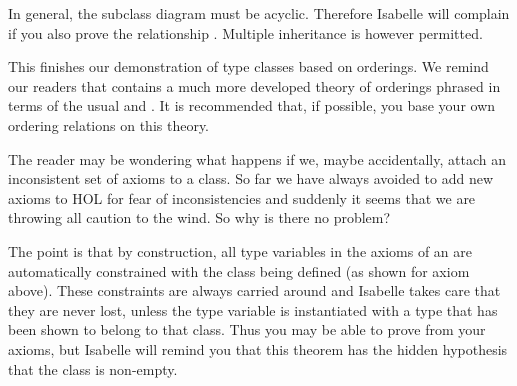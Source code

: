 \begin{isabellebody}
\begin{isamarkuptext}
In general, the subclass diagram must be acyclic. Therefore Isabelle will
complain if you also prove the relationship .
Multiple inheritance is however permitted.

This finishes our demonstration of type classes based on orderings.  We
remind our readers that  contains a much more developed theory of
orderings phrased in terms of the usual \isa{{\isasymle}} and \isa{{\isacharless}}.
It is recommended that, if possible,
you base your own ordering relations on this theory.%
\end{isamarkuptext}%
%
%
\begin{isamarkuptext}%
The reader may be wondering what happens if we, maybe accidentally,
attach an inconsistent set of axioms to a class. So far we have always
avoided to add new axioms to HOL for fear of inconsistencies and suddenly it
seems that we are throwing all caution to the wind. So why is there no
problem?

The point is that by construction, all type variables in the axioms of an
 are automatically constrained with the class being
defined (as shown for axiom  above). These constraints are
always carried around and Isabelle takes care that they are never lost,
unless the type variable is instantiated with a type that has been shown to
belong to that class. Thus you may be able to prove 
from your axioms, but Isabelle will remind you that this
theorem has the hidden hypothesis that the class is non-empty.%
\end{isamarkuptext}%
\end{isabellebody}%
